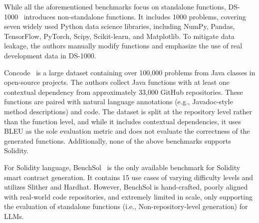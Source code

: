 While all the aforementioned benchmarks focus on standalone functions, DS-1000~\cite{lai2023ds} introduces non-standalone functions. 
It includes 1000 problems, covering seven widely used Python data science libraries, including NumPy, Pandas, TensorFlow, PyTorch, Scipy, Scikit-learn, and Matplotlib.
To mitigate data leakage, the authors manually modify functions and emphasize the use of real development data in DS-1000.


Concode~\cite{iyer2018mapping} is a large dataset containing over 100,000 problems from Java classes in open-source projects.
The authors collect Java functions with at least one contextual dependency from approximately 33,000 GitHub repositories. 
These functions are paired with natural language annotations (e.g., Javadoc-style method descriptions) and code.
The dataset is split at the repository level rather than the function level, and while it includes contextual dependencies, it uses BLEU as the sole evaluation metric and does not evaluate the correctness of the generated functions. 
Additionally, none of the above benchmarks supports Solidity.


For Solidity language, BenchSol~\cite{benchmark2024sol} is the only available benchmark for Solidity smart contract generation. 
It contains 15 use cases of varying difficulty levels and utilizes Slither and Hardhat.
However, BenchSol is hand-crafted, poorly aligned with real-world code repositories, and extremely limited in scale, only supporting the evaluation of standalone functions (i.e., Non-repository-level generation) for LLMs.